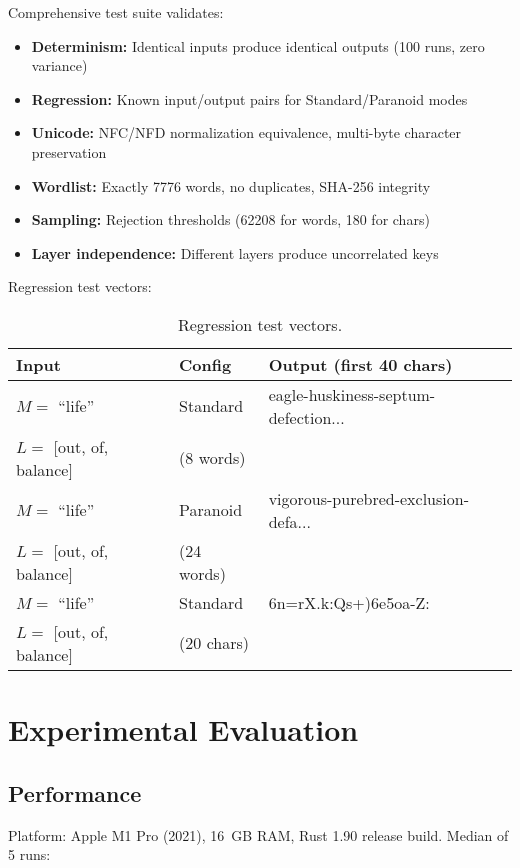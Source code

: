 \documentclass[11pt]{article}
\begin{document}
Comprehensive test suite validates:

\begin{itemize}
\item \textbf{Determinism:} Identical inputs produce identical outputs (100 runs, zero variance)
\item \textbf{Regression:} Known input/output pairs for Standard/Paranoid modes
\item \textbf{Unicode:} NFC/NFD normalization equivalence, multi-byte character preservation
\item \textbf{Wordlist:} Exactly 7776 words, no duplicates, SHA-256 integrity
\item \textbf{Sampling:} Rejection thresholds (62208 for words, 180 for chars)
\item \textbf{Layer independence:} Different layers produce uncorrelated keys
\end{itemize}

Regression test vectors:

\begin{table}[H]
\centering
\small
\begin{tabular}{@{}lll@{}}
\toprule
\textbf{Input} & \textbf{Config} & \textbf{Output (first 40 chars)} \\
\midrule
$M=$ ``life'' & Standard & eagle-huskiness-septum-defection... \\
$L=$ [out, of, balance] & (8 words) & \\
\midrule
$M=$ ``life'' & Paranoid & vigorous-purebred-exclusion-defa... \\
$L=$ [out, of, balance] & (24 words) & \\
\midrule
$M=$ ``life'' & Standard & 6n=rX.k:Qs+)6e5oa-Z: \\
$L=$ [out, of, balance] & (20 chars) & \\
\bottomrule
\end{tabular}
\caption{Regression test vectors.}\end{table}

\section{Experimental Evaluation}

\subsection{Performance}

Platform: Apple M1 Pro (2021), 16~GB RAM, Rust 1.90 release build. Median of 5 runs:
\end{document}
